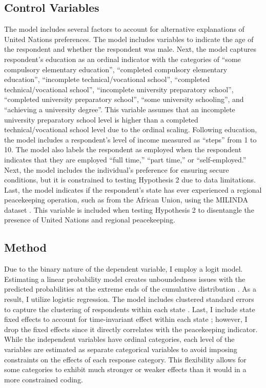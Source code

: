 \documentclass[12pt]{article}
\newcommand{\UN}[1]{United Nations}
\begin{document}
\subsection*{Control Variables}

The model includes several factors to account for alternative explanations of \UN{} preferences. The model includes variables to indicate the age of the respondent and whether the respondent was male. Next, the model captures respondent's education as an ordinal indicator with the categories of ``some compulsory elementary education”, ``completed compulsory elementary education”, ``incomplete technical/vocational school”, ``completed technical/vocational school”, ``incomplete university preparatory school”, ``completed university preparatory school”, ``some university schooling”, and ``achieving a university degree”. This variable assumes that an incomplete university preparatory school level is higher than a completed technical/vocational school level due to the ordinal scaling. Following education, the model includes a respondent's level of income measured as ``steps'' from 1 to 10. The model also labels the respondent as employed when the respondent indicates that they are employed ``full time,'' ``part time,'' or ``self-employed.'' Next, the model includes the individual's preference for ensuring secure conditions, but it is constrained to testing Hypothesis 2 due to data limitations. Last, the model indicates if the respondent's state has ever experienced a regional peacekeeping operation, such as from the African Union, using the MILINDA dataset \citep{jetschke2020milinda}. This variable is included when testing Hypothesis 2 to disentangle the presence of \UN{} and regional peacekeeping.\footnotemark[10] 


\subsection*{Method}

Due to the binary nature of the dependent variable, I employ a logit model. Estimating a linear probability model creates unboundedness issues with the predicted probabilities at the extreme ends of the cumulative distribution \citep{studenmund}. As a result, I utilize logistic regression. The model includes clustered standard errors to capture the clustering of respondents within each state \citep{jackson2020corrected}. Last, I include state fixed effects to account for time-invariant effect within each state \citep{cunningham2021causal}; however, I drop the fixed effects since it directly correlates with the peacekeeping indicator. While the independent variables have ordinal categories, each level of the variables are estimated as separate categorical variables to avoid imposing constraints on the effects of each response category. This flexibility allows for some categories to exhibit much stronger or weaker effects than it would in a more constrained coding. 
\end{document}
